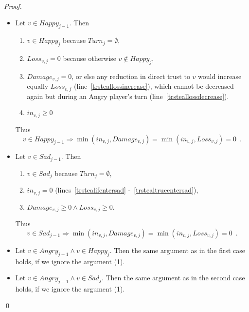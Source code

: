 \documentclass[11pt]{llncs}
\begin{document}
    \begin{proof}
       \begin{itemize}
          \item Let $v \in Happy_{j-1}$. Then
          \begin{enumerate}
             \item $v \in Happy_j$ because $Turn_{j} = \emptyset$,
             \item $Loss_{v, j} = 0$ because otherwise $v \notin Happy_j$,
             \item $Damage_{v, j} = 0$, or else any reduction in direct trust to $v$ would increase equally
             $Loss_{v, j}$ (line~\ref{trsteallossincrease}), which cannot be decreased again but during an Angry player's turn
             (line~\ref{trsteallossdecrease}).
             \item $in_{v, j} \geq 0$
          \end{enumerate}
          Thus
          \begin{equation}
             v \in Happy_{j-1} \Rightarrow \min\left(in_{v, j}, Damage_{v,j}\right) = \min\left(in_{v, j}, Loss_{v,j}\right)
             = 0 \enspace.
          \end{equation}
          \item Let $v \in Sad_{j-1}$. Then
          \begin{enumerate}
             \item $v \in Sad_j$ because $Turn_{j} = \emptyset$, 
             \item $in_{v, j} = 0$ (lines~\ref{trstealifentersad} -~\ref{trstealtrueentersad}),
             \item $Damage_{v, j} \geq 0 \wedge Loss_{v, j} \geq 0$.
          \end{enumerate}
          Thus
          \begin{equation}
             v \in Sad_{j-1} \Rightarrow \min\left(in_{v, j}, Damage_{v,j}\right) = \min\left(in_{v, j}, Loss_{v,j}\right) =
             0 \enspace.
          \end{equation}
          \item Let $v \in Angry_{j-1} \wedge v \in Happy_j$. Then the same argument as in the first case holds, if
          we ignore the argument (1).
          \item Let $v \in Angry_{j-1} \wedge v \in Sad_j$. Then the same argument as in the second case holds, if 
          we ignore the argument (1).
       \end{itemize} \qed
    \end{proof}
\end{document}
